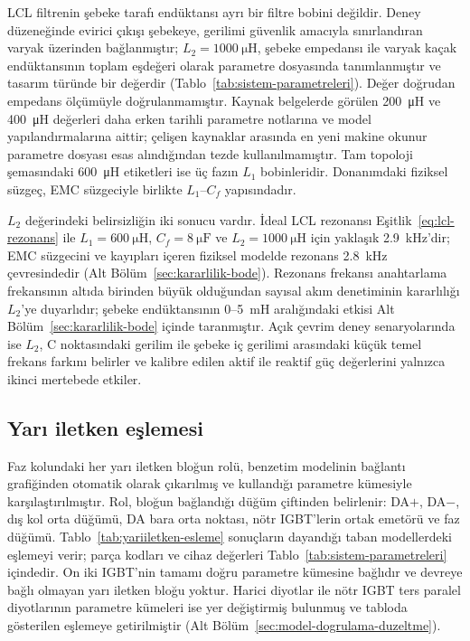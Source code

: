 LCL filtrenin şebeke tarafı endüktansı ayrı bir filtre bobini değildir. Deney düzeneğinde evirici çıkışı şebekeye, gerilimi güvenlik amacıyla sınırlandıran varyak üzerinden bağlanmıştır; $L_2=\SI{1000}{\micro\henry}$, şebeke empedansı ile varyak kaçak endüktansının toplam eşdeğeri olarak parametre dosyasında tanımlanmıştır ve tasarım türünde bir değerdir (Tablo~\ref{tab:sistem-parametreleri}). Değer doğrudan empedans ölçümüyle doğrulanmamıştır. Kaynak belgelerde görülen \SI{200}{\micro\henry} ve \SI{400}{\micro\henry} değerleri daha erken tarihli parametre notlarına ve model yapılandırmalarına aittir; çelişen kaynaklar arasında en yeni makine okunur parametre dosyası esas alındığından tezde kullanılmamıştır. Tam topoloji şemasındaki \SI{600}{\micro\henry} etiketleri ise üç fazın $L_1$ bobinleridir. Donanımdaki fiziksel süzgeç, EMC süzgeciyle birlikte $L_1$--$C_f$ yapısındadır.

$L_2$ değerindeki belirsizliğin iki sonucu vardır. İdeal LCL rezonansı Eşitlik~\eqref{eq:lcl-rezonans} ile $L_1=\SI{600}{\micro\henry}$, $C_f=\SI{8}{\micro\farad}$ ve $L_2=\SI{1000}{\micro\henry}$ için yaklaşık \SI{2.9}{\kilo\hertz}'dir; EMC süzgecini ve kayıpları içeren fiziksel modelde rezonans \SI{2.8}{\kilo\hertz} çevresindedir (Alt Bölüm~\ref{sec:kararlilik-bode}). Rezonans frekansı anahtarlama frekansının altıda birinden büyük olduğundan sayısal akım denetiminin kararlılığı $L_2$'ye duyarlıdır; şebeke endüktansının \num{0}--\SI{5}{\milli\henry} aralığındaki etkisi Alt Bölüm~\ref{sec:kararlilik-bode} içinde taranmıştır. Açık çevrim deney senaryolarında ise $L_2$, C noktasındaki gerilim ile şebeke iç gerilimi arasındaki küçük temel frekans farkını belirler ve kalibre edilen aktif ile reaktif güç değerlerini yalnızca ikinci mertebede etkiler.

\subsection{Yarı iletken eşlemesi}
\label{sec:yariiletken-esleme}

Faz kolundaki her yarı iletken bloğun rolü, benzetim modelinin bağlantı grafiğinden otomatik olarak çıkarılmış ve kullandığı parametre kümesiyle karşılaştırılmıştır. Rol, bloğun bağlandığı düğüm çiftinden belirlenir: DA$+$, DA$-$, dış kol orta düğümü, DA bara orta noktası, nötr IGBT'lerin ortak emetörü ve faz düğümü. Tablo~\ref{tab:yariiletken-esleme} sonuçların dayandığı taban modellerdeki eşlemeyi verir; parça kodları ve cihaz değerleri Tablo~\ref{tab:sistem-parametreleri} içindedir. On iki IGBT'nin tamamı doğru parametre kümesine bağlıdır ve devreye bağlı olmayan yarı iletken bloğu yoktur. Harici diyotlar ile nötr IGBT ters paralel diyotlarının parametre kümeleri ise yer değiştirmiş bulunmuş ve tabloda gösterilen eşlemeye getirilmiştir (Alt Bölüm~\ref{sec:model-dogrulama-duzeltme}).

